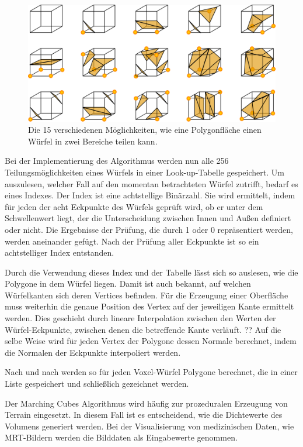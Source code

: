 \begin{figure}
	\centering
	\includegraphics[width=0.7\linewidth]{images/MarchingCubes.png}
	\caption{Die 15 verschiedenen Möglichkeiten, wie eine Polygonfläche einen Würfel in zwei Bereiche teilen kann.}
	\label{img:marchingCubes}
\end{figure}

Bei der Implementierung des Algorithmus werden nun alle 256 Teilungsmöglichkeiten eines Würfels in einer Look-up-Tabelle gespeichert. Um auszulesen, welcher Fall auf den momentan betrachteten Würfel zutrifft, bedarf es eines Indexes. 
Der Index ist eine achtstellige Binärzahl. Sie wird ermittelt, indem für jeden der acht Eckpunkte des Würfels geprüft wird, ob er unter dem Schwellenwert liegt, der die Unterscheidung zwischen Innen und Außen definiert oder nicht. Die Ergebnisse der Prüfung, die durch 1 oder 0 repräsentiert werden, werden aneinander gefügt. Nach der Prüfung aller Eckpunkte ist so ein achtstelliger Index entstanden. 

Durch die Verwendung dieses Index und der Tabelle lässt sich so auslesen, wie die Polygone in dem Würfel liegen. Damit ist auch bekannt, auf welchen Würfelkanten sich deren Vertices befinden. Für die Erzeugung einer Oberfläche muss weiterhin die genaue Position des Vertex auf der jeweiligen Kante ermittelt werden. Dies geschieht durch lineare Interpolation zwischen den Werten der Würfel-Eckpunkte, zwischen denen die betreffende Kante verläuft. ??
Auf die selbe Weise wird für jeden Vertex der Polygone dessen Normale berechnet, indem die Normalen der Eckpunkte interpoliert werden.

Nach und nach werden so für jeden Voxel-Würfel Polygone berechnet, die in einer Liste gespeichert und schließlich gezeichnet werden.

Der Marching Cubes Algorithmus wird häufig zur prozeduralen Erzeugung von Terrain eingesetzt. In diesem Fall ist es entscheidend, wie die Dichtewerte des Volumens generiert werden. Bei der Visualisierung von medizinischen Daten, wie MRT-Bildern werden die Bilddaten als Eingabewerte genommen.

